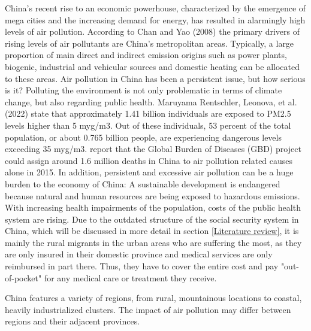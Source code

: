 \documentclass[]{article}
\begin{document}
China's recent rise to an economic powerhouse, characterized by the emergence of mega cities and the increasing demand for energy, has resulted in alarmingly high levels of air pollution. According to Chan and Yao (2008) the primary drivers of rising levels of air pollutants are China's metropolitan areas. Typically, a large proportion of main direct and indirect emission origins such as power plants, biogenic, industrial and vehicular sources and domestic heating can be allocated to these areas.%
Air pollution in China has been a persistent issue, but how serious is it? Polluting the environment is not only problematic in terms of climate change, but also regarding public health. Maruyama Rentschler, Leonova, et al. (2022) state that approximately 1.41 billion individuals are exposed to PM2.5 levels higher than 5 myg/m3. Out of these individuals, 53 percent of the total population, or about 0.765 billion people, are experiencing dangerous levels exceeding 35 myg/m3. %
\cite{song_air_2017} report that the Global Burden of Diseases (GBD) project could assign around 1.6 million deaths in China to air pollution related causes alone in 2015. In addition, persistent and excessive air pollution can be a huge burden to the economy of China: A sustainable development is endangered because natural and human resources are being exposed to hazardous emissions. \\
With increasing health impairments of the population, costs of the public health system are rising. 
Due to the outdated structure of the social security system in China, which will be discussed in more detail in section \ref{Literature review}, it is mainly the rural migrants in the urban areas who are suffering the most, as they are only insured in their domestic province and medical services are only reimbursed in part there. Thus, they have to cover the entire cost and pay "out-of-pocket" for any medical care or treatment they receive.  

China features a variety of regions, from rural, mountainous locations to coastal, heavily industrialized clusters. The impact of air pollution may differ between regions and their adjacent provinces.
\end{document}

